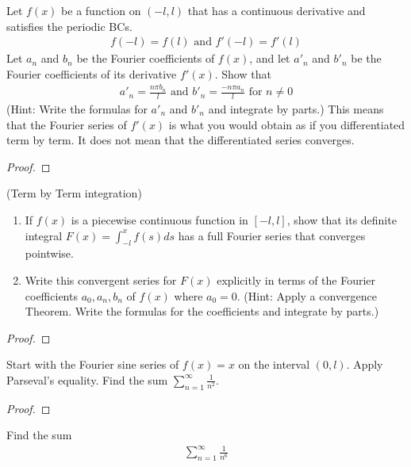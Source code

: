 \documentclass{report}
\begin{document}
\begin{question}{}{}
Let $f(x)$ be a function on $(-l,l)$ that has a continuous derivative and satisfies the periodic BCs. 
\begin{align*}
f(-l)=f(l)\text{ and }f'(-l)=f'(l)
\end{align*}
Let $a_n$ and  $b_n$ be the Fourier coefficients of $f(x)$, and let $a'_n$ and  $b'_n$ be the Fourier coefficients of its derivative $f'(x)$. Show that 
\begin{align*}
a'_n= \frac{n \pi  b_n}{l}\text{ and }b'_n = \frac{- n \pi  a_n}{l}\text{ for }n\neq 0
\end{align*}
(Hint: Write the formulas for $a'_n$ and $b'_n$ and integrate by parts.) This means that the Fourier series of $f'(x)$ is what you would obtain as if you differentiated term by term. It does not mean that the differentiated series converges. 
\end{question}
\begin{proof}

\end{proof}
\begin{question}{}{}
  (Term by Term integration) 
\begin{enumerate}[label=(\alph*)]
  \item If $f(x)$ is a piecewise continuous function in $[-l,l]$, show that its definite integral $F(x)=\int_{-l}^x f(s)ds$ has a full Fourier series that converges pointwise. 
  \item Write this convergent series for $F(x)$ explicitly in terms of the Fourier coefficients $a_0,a_n,b_n$ of  $f(x)$ where $a_0=0$. (Hint: Apply a convergence Theorem. Write the formulas for the coefficients and integrate by parts.)
\end{enumerate}
\end{question}
\begin{proof}

\end{proof}
\begin{question}{}{}
Start with the Fourier sine series of $f(x)=x$ on the interval $(0,l)$. Apply Parseval's equality. Find the sum $\sum_{n=1}^{\infty } \frac{1}{n^2}$. 
\end{question}
\begin{proof}

\end{proof}
\begin{question}{}{}
Find the sum 
\begin{align*}
\sum_{n=1}^{\infty} \frac{1}{n^6}
\end{align*}
\end{question}
\end{document}
